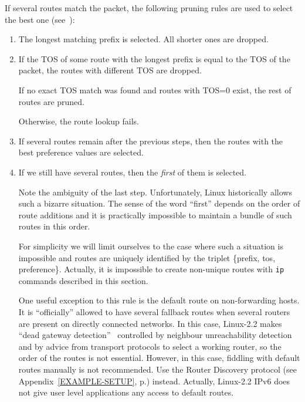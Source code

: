 If several routes match the packet, the following pruning rules
are used to select the best one (see~\cite{RFC1812}):
\begin{enumerate}
\item The longest matching prefix is selected. All shorter ones
are dropped.

\item If the TOS of some route with the longest prefix is equal to the TOS
of the packet, the routes with different TOS are dropped.

If no exact TOS match was found and routes with TOS=0 exist,
the rest of routes are pruned.

Otherwise, the route lookup fails.

\item If several routes remain after the previous steps, then
the routes with the best preference values are selected.

\item If we still have several routes, then the {\em first\/} of them
is selected.

\begin{NB}
 Note the ambiguity of the last step. Unfortunately, Linux
 historically allows such a bizarre situation. The sense of the
word ``first'' depends on the order of route additions and it is practically
impossible to maintain a bundle of such routes in this order.
\end{NB}

For simplicity we will limit ourselves to the case where such a situation
is impossible and routes are uniquely identified by the triplet
\{prefix, tos, preference\}. Actually, it is impossible to create
non-unique routes with \verb|ip| commands described in this section.

One useful exception to this rule is the default route on non-forwarding
hosts. It is ``officially'' allowed to have several fallback routes
when several routers are present on directly connected networks.
In this case, Linux-2.2 makes ``dead gateway detection''~\cite{RFC1122}
controlled by neighbour unreachability detection and by advice
from transport protocols to select a working router, so the order
of the routes is not essential. However, in this case,
fiddling with default routes manually is not recommended. Use the Router Discovery
protocol (see Appendix~\ref{EXAMPLE-SETUP}, p.\pageref{EXAMPLE-SETUP})
instead. Actually, Linux-2.2 IPv6 does not give user level applications
any access to default routes.
\end{enumerate}

